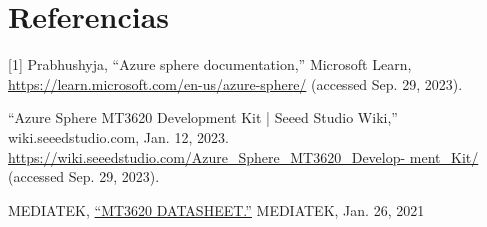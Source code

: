 \section{Referencias}
[1] Prabhushyja, “Azure sphere documentation,” Microsoft Learn, \href{https://learn.microsoft.com/en-us/azure-sphere/}{https://learn.microsoft.com/en-us/azure-sphere/} (accessed Sep. 29, 2023). \par
[2] “Azure Sphere MT3620 Development Kit | Seeed Studio Wiki,” wiki.seeedstudio.com, Jan. 12, 2023. \href{https://wiki.seeedstudio.com/Azure_Sphere_MT3620_Development_Kit/}{https://wiki.seeedstudio.com/Azure\_Sphere\_MT3620\_Develop-
ment\_Kit/}
(accessed Sep. 29, 2023). \par
[3] MEDIATEK, \href{bhttps://d86o2zu8ugzlg.cloudfront.net/mediatek-craft/documents/mt3620/MT3620-Datasheet-v1.7.pdf}{“MT3620 DATASHEET.”}  MEDIATEK, Jan. 26, 2021 
‌